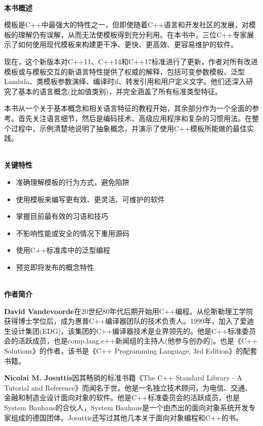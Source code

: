 \documentclass[11pt,a4paper,UTF8]{book}
\begin{document}
\begin{sloppypar}
	\hspace*{\fill} \\ %
	\noindent\textbf{本书概述}
	
	模板是C++中最强大的特性之一，但即使随着C++语言和开发社区的发展，对模板的理解仍有误解，从而无法使模板得到充分利用。在本书中，三位C++专家展示了如何使用现代模板来构建更干净、更快、更高效、更容易维护的软件。
	
	现在，这个新版本对C++11、C++14和C++17标准进行了更新，作者对所有改进模板或与模板交互的新语言特性提供了权威的解释，包括可变参数模板、泛型Lambda、类模板参数演绎、编译时if、转发引用和用户定义文字。他们还深入研究了基本的语言概念(比如值类别)，并完全涵盖了所有标准类型特征。
	
	本书从一个关于基本概念和相关语言特征的教程开始，其余部分作为一个全面的参考。首先关注语言细节，然后是编码技术、高级应用程序和复杂的习惯用法。在整个过程中，示例清楚地说明了抽象概念，并演示了使用C++模板所能做的最佳实践。
	
	\hspace*{\fill} \\ %
	\noindent\textbf{关键特性}
	\begin{itemize}
		\item 准确理解模板的行为方式，避免陷阱
		\item 使用模板来编写更有效、更灵活、可维护的软件
		\item 掌握目前最有效的习语和技巧
		\item 不影响性能或安全的情况下重用源码
		\item 使用C++标准库中的泛型编程
		\item 预览即将发布的概念特性
	\end{itemize}
	
	\hspace*{\fill} \\ %
	\noindent\textbf{作者简介}
	
	\textbf{David Vandevoorde}在20世纪80年代后期开始用C++编程。从伦斯勒理工学院获得博士学位后，成为惠普C++编译器团队的技术负责人。1999年，加入了爱迪生设计集团(EDG)，该集团的C++编译器技术是业界领先的。他是C++标准委员会的活跃成员，也是comp.lang.c++新闻组的主持人(他参与创办的)。也是《C++ Solutions》的作者，该书是《C++ Programming Language, 3rd Edition》的配套书籍。
	
	\textbf{Nicolai M. Josuttis}因其畅销的标准书籍《The C++ Standard Library - A Tutorial and Reference》而闻名于世。他是一名独立技术顾问，为电信、交通、金融和制造业设计面向对象的软件。他是C++标准委员会的活跃成员，也是System Bauhaus的合伙人，System Bauhaus是一个由杰出的面向对象系统开发专家组成的德国团体。Josuttis还写过其他几本关于面向对象编程和C++的书。
	

\end{sloppypar}
\end{document}
